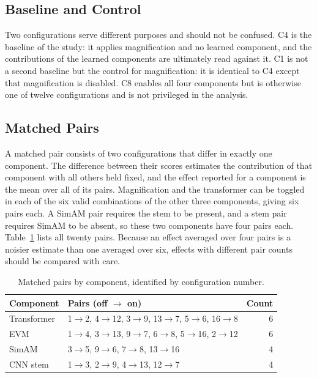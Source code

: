 \subsection{Baseline and Control}
\label{sec:baseline-control}

Two configurations serve different purposes and should not be confused. C4 is the baseline of the study: it applies magnification and no learned component, and the contributions of the learned components are ultimately read against it. C1 is not a second baseline but the control for magnification: it is identical to C4 except that magnification is disabled. C8 enables all four components but is otherwise one of twelve configurations and is not privileged in the analysis.

\subsection{Matched Pairs}
\label{sec:matched-pairs}
\label{sec:matched-pairs-table}

A matched pair consists of two configurations that differ in exactly one component. The difference between their scores estimates the contribution of that component with all others held fixed, and the effect reported for a component is the mean over all of its pairs. Magnification and the transformer can be toggled in each of the six valid combinations of the other three components, giving six pairs each. A SimAM pair requires the stem to be present, and a stem pair requires SimAM to be absent, so these two components have four pairs each. Table~\ref{tab:matched-pairs} lists all twenty pairs. Because an effect averaged over four pairs is a noisier estimate than one averaged over six, effects with different pair counts should be compared with care.

\begin{table}[htbp]
	\centering
	\small
	\begin{tabular}{@{}l l r@{}}
		\hline
		\textbf{Component} & \textbf{Pairs (off $\rightarrow$ on)} & \textbf{Count} \\
		\hline
		Transformer & 1$\rightarrow$2, 4$\rightarrow$12, 3$\rightarrow$9, 13$\rightarrow$7, 5$\rightarrow$6, 16$\rightarrow$8 & 6 \\
		EVM         & 1$\rightarrow$4, 3$\rightarrow$13, 9$\rightarrow$7, 6$\rightarrow$8, 5$\rightarrow$16, 2$\rightarrow$12 & 6 \\
		SimAM       & 3$\rightarrow$5, 9$\rightarrow$6, 7$\rightarrow$8, 13$\rightarrow$16 & 4 \\
		CNN stem    & 1$\rightarrow$3, 2$\rightarrow$9, 4$\rightarrow$13, 12$\rightarrow$7 & 4 \\
		\hline
	\end{tabular}
	\caption[Matched pairs by component]{Matched pairs by component, identified by configuration number.}
	\label{tab:matched-pairs}
\end{table}


